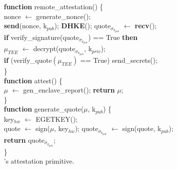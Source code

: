 
\begin{algorithm}
\SetAlgoLined
\small

\textbf{function} remote\_attestation() \{ \\
 \Indp
 nonce $\leftarrow$ generate\_nonce();\\
 \textbf{send}(nonce, k$_{pub}$); \textbf{DHKE}(); quote$_{\sigma_{k_{pub}}}$ $\leftarrow$ \textbf{recv}();\\
 \textbf{if} verify\_signature(quote$_{\sigma_{k_{pub}}}$) == True \textbf{then}\\
    \Indp
        $\mu_{TEE}$ $\leftarrow$ decrypt(quote$_{\sigma_{k_{pub}}}$, k$_{priv}$);\\
        \textbf{if} (verify\_quote$(\mu_{TEE})$ == True) send\_secrets();\\
    \Indm
 \Indm
\} \\


\textbf{function} attest() \{ \\
\Indp
    $\mu$ $\leftarrow$ gen\_enclave\_report(); \textbf{return} $\mu$;\\ 
\Indm
\} \\

\textbf{function} generate\_quote($\mu$, k$_{pub}$) \{ \\
\Indp
    key$_{hw}$ $\leftarrow$ EGETKEY();\\
    quote $\leftarrow$ sign($\mu$, key$_{hw}$); 
    quote$_{\sigma_{k_{pub}}}$ $\leftarrow$ sign(quote, k$_{pub}$);\\
    \textbf{return } quote$_{\sigma_{k_{pub}}}$;\\
\Indm
\} \\
\caption{\projecttitle{}'s attestation primitive.}
\label{algo:attestation}
\vspace{-3pt}
\end{algorithm}
\fi 





